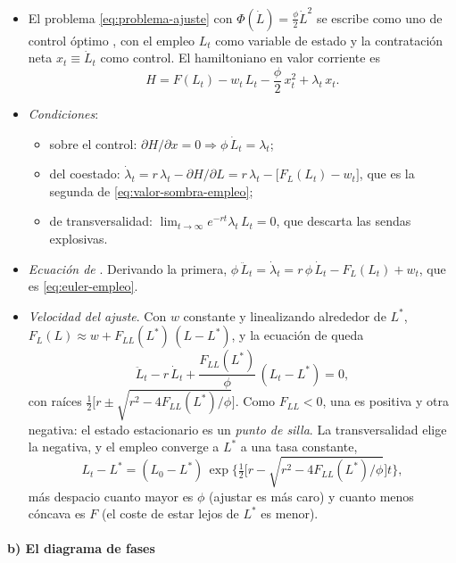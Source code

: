 \documentclass[11pt]{article}
\begin{document}
\begin{itemize}
\item El problema \eqref{eq:problema-ajuste} con $\Phi(\dot L)=\tfrac{\phi}{2}\dot L^{2}$ se escribe como uno de control óptimo , con el empleo $L_t$ como variable de estado y la contratación neta $x_t\equiv\dot L_t$ como control. El hamiltoniano en valor corriente es
  \begin{equation*}
  H=F(L_t)-w_t\,L_t-\frac{\phi}{2}\,x_t^{2}+\lambda_t\,x_t.
  \end{equation*}
\item \emph{Condiciones}:
  \begin{itemize}
  \item sobre el control: $\partial H/\partial x=0\Rightarrow\phi\,\dot L_t=\lambda_t$;
  \item del coestado: $\dot\lambda_t=r\,\lambda_t-\partial H/\partial L=r\,\lambda_t-\big[F_L(L_t)-w_t\big]$, que es la segunda de \eqref{eq:valor-sombra-empleo};
  \item de transversalidad: $\lim_{t\to\infty}e^{-rt}\lambda_t\,L_t=0$, que descarta las sendas explosivas.
  \end{itemize}
\item \emph{Ecuación de }. Derivando la primera, $\phi\,\ddot L_t=\dot\lambda_t=r\,\phi\,\dot L_t-F_L(L_t)+w_t$, que es \eqref{eq:euler-empleo}.
\item \emph{Velocidad del ajuste}. Con $w$ constante y linealizando alrededor de $L^*$, $F_L(L)\approx w+F_{LL}(L^*)\,(L-L^*)$, y la ecuación de  queda
  \begin{equation*}
  \ddot L_t-r\,\dot L_t+\frac{F_{LL}(L^*)}{\phi}\,(L_t-L^*)=0,
  \end{equation*}
  con raíces $\tfrac12\big[r\pm\sqrt{r^{2}-4F_{LL}(L^*)/\phi}\big]$. Como $F_{LL}<0$, una es positiva y otra negativa: el estado estacionario es un \emph{punto de silla}. La transversalidad elige la negativa, y el empleo converge a $L^*$ a una tasa constante,
  \begin{equation*}
  L_t-L^*=(L_0-L^*)\,\exp\Big\{\tfrac12\Big[r-\sqrt{r^{2}-4F_{LL}(L^*)/\phi}\Big]t\Big\},
  \end{equation*}
  más despacio cuanto mayor es $\phi$ (ajustar es más caro) y cuanto menos cóncava es $F$ (el coste de estar lejos de $L^*$ es menor). \findemo
\end{itemize}

\paragraph{b) El diagrama de fases}
\end{document}
